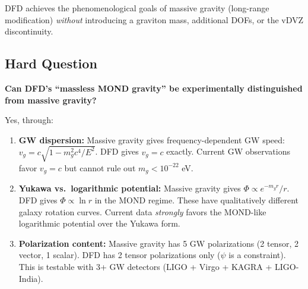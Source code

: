 \documentclass[11pt,a4paper]{article}
\begin{document}
DFD achieves the phenomenological goals of massive gravity (long-range modification) \emph{without} introducing a graviton mass, additional DOFs, or the vDVZ discontinuity.

\subsection{Hard Question}

\textbf{Can DFD's ``massless MOND gravity'' be experimentally distinguished from massive gravity?}

Yes, through:
\begin{enumerate}
\item \textbf{GW dispersion:} Massive gravity gives frequency-dependent GW speed: $v_g = c\sqrt{1 - m_g^2c^4/E^2}$. DFD gives $v_g = c$ exactly. Current GW observations favor $v_g = c$ but cannot rule out $m_g < 10^{-22}$ eV.

\item \textbf{Yukawa vs.\ logarithmic potential:} Massive gravity gives $\Phi \propto e^{-m_g r}/r$. DFD gives $\Phi \propto \ln r$ in the MOND regime. These have qualitatively different galaxy rotation curves. Current data \emph{strongly} favors the MOND-like logarithmic potential over the Yukawa form.

\item \textbf{Polarization content:} Massive gravity has 5 GW polarizations (2 tensor, 2 vector, 1 scalar). DFD has 2 tensor polarizations only ($\psi$ is a constraint). This is testable with 3+ GW detectors (LIGO + Virgo + KAGRA + LIGO-India).
\end{enumerate}
\end{document}

